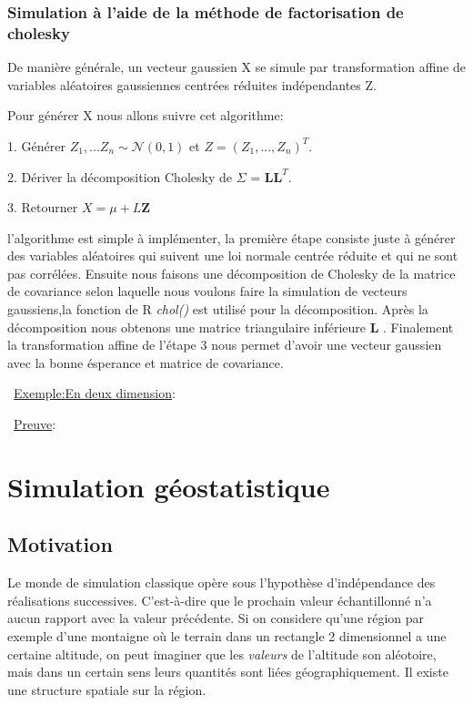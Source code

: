\documentclass[10pt]{article} %
\begin{document}
 \subsubsection{Simulation à l'aide de la méthode de factorisation de cholesky}

 De manière générale, un vecteur gaussien X se simule par transformation affine de
 variables aléatoires gaussiennes centrées réduites indépendantes Z.

 Pour générer X nous allons suivre cet algorithme:\

 1. Générer $Z_1, ... Z_n \sim \mathcal{N}(0 , 1)$ et $Z = (Z_1,...,Z_n)^T$.

 2. Dériver la décomposition Cholesky de $\Sigma$ = $\textbf{LL}^T$.

 3. Retourner $X = \mu + L\textbf{Z}$


 l'algorithme est simple à implémenter, la première étape consiste juste à générer des variables aléatoires qui suivent une loi normale centrée réduite et qui ne sont pas corrélées. Ensuite nous faisons une décomposition de Cholesky de la matrice de covariance selon laquelle nous voulons faire la simulation de vecteurs gaussiens,la fonction de R {\it chol()} est utilisé pour la décomposition. Après la décomposition nous obtenons une matrice triangulaire inférieure \textbf{L} .
 Finalement la transformation affine de l'étape 3 nous permet d'avoir une vecteur gaussien avec la bonne ésperance et matrice de covariance.

 \
 \underline{Exemple:En deux dimension}:


 \
 \underline{Preuve}:



\section{Simulation géostatistique}

\subsection{Motivation}

Le monde de simulation classique opère sous l'hypothèse d'indépendance des réalisations successives. C'est-à-dire que le prochain
valeur échantillonné n'a aucun rapport avec la valeur précédente. Si on considere qu'une région par exemple d'une montaigne où le terrain
dans un rectangle 2 dimensionnel a une certaine altitude, on peut imaginer que les \textit{valeurs} de l'altitude son aléotoire, mais dans un
certain sens leurs quantités sont liées géographiquement. Il existe une structure spatiale sur la région.
\end{document}
